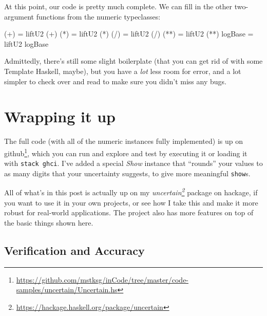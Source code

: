 \documentclass[]{article}
\newenvironment{Shaded}{}{}
\newcommand{\FunctionTok}[1]{\textcolor[rgb]{0.02,0.16,0.49}{#1}}
\newcommand{\NormalTok}[1]{#1}
\newcommand{\OperatorTok}[1]{\textcolor[rgb]{0.40,0.40,0.40}{#1}}
\newcommand{\OtherTok}[1]{\textcolor[rgb]{0.00,0.44,0.13}{#1}}
\renewcommand{\href}[2]{#2\footnote{\url{#1}}}
\begin{document}
At this point, our code is pretty much complete. We can fill in the other
two-argument functions from the numeric typeclasses:

\begin{Shaded}
\begin{Highlighting}[]
\NormalTok{(}\OperatorTok{+}\NormalTok{)     }\OtherTok{=}\NormalTok{ liftU2 (}\OperatorTok{+}\NormalTok{)}
\NormalTok{(}\OperatorTok{*}\NormalTok{)     }\OtherTok{=}\NormalTok{ liftU2 (}\OperatorTok{*}\NormalTok{)}
\NormalTok{(}\OperatorTok{/}\NormalTok{)     }\OtherTok{=}\NormalTok{ liftU2 (}\OperatorTok{/}\NormalTok{)}
\NormalTok{(}\OperatorTok{**}\NormalTok{)    }\OtherTok{=}\NormalTok{ liftU2 (}\OperatorTok{**}\NormalTok{)}
\FunctionTok{logBase} \OtherTok{=}\NormalTok{ liftU2 }\FunctionTok{logBase}
\end{Highlighting}
\end{Shaded}

Admittedly, there's still some slight boilerplate (that you can get rid of with
some Template Haskell, maybe), but you have a \emph{lot} less room for error,
and a lot simpler to check over and read to make sure you didn't miss any bugs.

\hypertarget{wrapping-it-up}{%
\section{Wrapping it up}\label{wrapping-it-up}}

The full code (with all of the numeric instances fully implemented) is up
\href{https://github.com/mstksg/inCode/tree/master/code-samples/uncertain/Uncertain.hs}{on
github}, which you can run and explore and test by executing it or loading it
with \texttt{stack\ ghci}. I've added a special \emph{Show} instance that
``rounds'' your values to as many digits that your uncertainty suggests, to give
more meaningful \texttt{show}s.

All of what's in this post is actually up on my
\emph{\href{https://hackage.haskell.org/package/uncertain}{uncertain}} package
on hackage, if you want to use it in your own projects, or see how I take this
and make it more robust for real-world applications. The project also has more
features on top of the basic things shown here.

\hypertarget{verification-and-accuracy}{%
\subsection{Verification and Accuracy}\label{verification-and-accuracy}}
\end{document}
